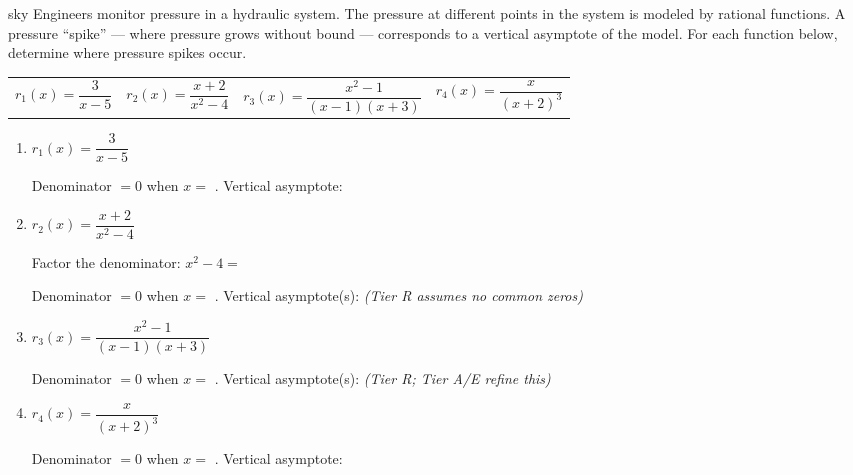 \documentclass[10pt]{article}
\begin{document}
\namepartnerperiod

\vspace{0.1in}

\begin{scenariobox}{sky}
\small
Engineers monitor pressure in a hydraulic system. The pressure at different points in the
system is modeled by rational functions. A pressure ``spike'' --- where pressure grows without
bound --- corresponds to a vertical asymptote of the model. For each function below, determine
where pressure spikes occur.

\medskip
\renewcommand{\arraystretch}{1.4}
\begin{tabular}{@{} l l @{\qquad} l l @{}}
$r_1(x) = \dfrac{3}{x - 5}$ &
$r_2(x) = \dfrac{x + 2}{x^2 - 4}$ &
$r_3(x) = \dfrac{x^2 - 1}{(x-1)(x+3)}$ &
$r_4(x) = \dfrac{x}{(x+2)^3}$
\end{tabular}
\end{scenariobox}

\vspace{0.1in}

\begin{tcolorbox}[colback=white, colframe=black!40,
    title=\textbf{Tier R --- Remediate},
    fonttitle=\bfseries, arc=2mm, left=3mm, right=3mm, top=2mm, bottom=2mm]

\begin{enumerate}[itemsep=10pt]
  \item $r_1(x) = \dfrac{3}{x - 5}$

        Denominator $= 0$ when $x =$ . \quad Vertical asymptote: 

  \item $r_2(x) = \dfrac{x + 2}{x^2 - 4}$

        Factor the denominator: $x^2 - 4 =$ 

        Denominator $= 0$ when $x =$ . \quad
        Vertical asymptote(s):  \textit{(Tier R assumes no common zeros)}

  \item $r_3(x) = \dfrac{x^2 - 1}{(x-1)(x+3)}$

        Denominator $= 0$ when $x =$ . \quad
        Vertical asymptote(s):  \textit{(Tier R; Tier A/E refine this)}

  \item $r_4(x) = \dfrac{x}{(x+2)^3}$

        Denominator $= 0$ when $x =$ . \quad Vertical asymptote: 
\end{enumerate}
\end{tcolorbox}
\end{document}
